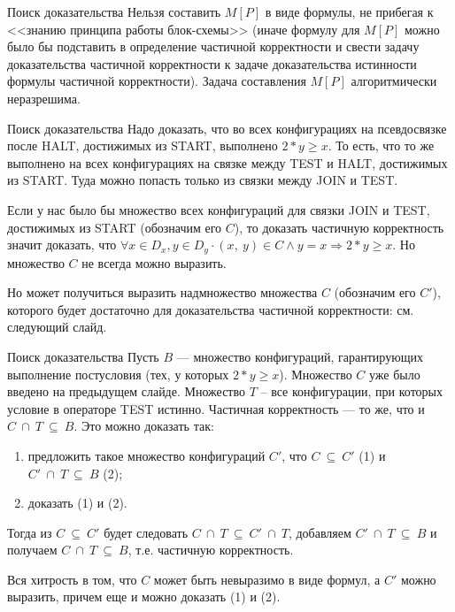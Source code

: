 \documentclass[hyperref={unicode=true}]{beamer}
\begin{document}
    \begin{frame}{Поиск доказательства}
    Нельзя составить $M[P]$ в виде формулы, не прибегая к <<знанию принципа работы блок-схемы>> (иначе формулу для $M[P]$ можно было бы подставить в определение частичной корректности и свести задачу доказательства частичной корректности к задаче доказательства истинности формулы частичной корректности). Задача составления $M[P]$ алгоритмически неразрешима.
    \end{frame}

    \begin{frame}{Поиск доказательства}
    Надо доказать, что во всех конфигурациях на псевдосвязке после HALT, достижимых из START, выполнено $2*y \geq x$. То есть, что то же выполнено на всех конфигурациях на связке между TEST и HALT, достижимых из START. Туда можно попасть только из связки между JOIN и TEST.

    Если у нас было бы множество всех конфигураций для связки JOIN и TEST, достижимых из START (обозначим его $C$), то доказать частичную корректность значит доказать, что $\forall x \in D_x, y \in D_y \cdot (x,~y) \in C \land y = x \Rightarrow 2 * y \geq x$. Но множество $C$ не всегда можно выразить.

    Но может получиться выразить надмножество множества $C$ (обозначим его $C'$), которого будет достаточно для доказательства частичной корректности: см. следующий слайд.
    \end{frame}

    \begin{frame}{Поиск доказательства}
    Пусть $B$ --- множество конфигураций, гарантирующих выполнение постусловия (тех, у которых $2 * y \geq x$). Множество $C$ уже было введено на предыдущем слайде. Множество $T$ -- все конфигурации, при которых условие в операторе TEST истинно. Частичная корректность --- то же, что и $C~\cap~T~\subseteq~B$. Это можно доказать так:
    \begin{enumerate}
    \item предложить такое множество конфигураций $C'$, что $C~\subseteq~C'$ (1) и $C'~\cap~T~\subseteq~B$ (2);
    \item доказать (1) и (2).
    \end{enumerate}
    Тогда из $C~\subseteq~C'$ будет следовать $C~\cap~T~\subseteq~C'~\cap~T$, добавляем $C'~\cap~T~\subseteq~B$ и получаем $C~\cap~T~\subseteq~B$, т.е. частичную корректность.

    Вся хитрость в том, что $C$ может быть невыразимо в виде формул, а $C'$ можно выразить, причем еще и можно доказать (1) и (2).
    \end{frame}
\end{document}
